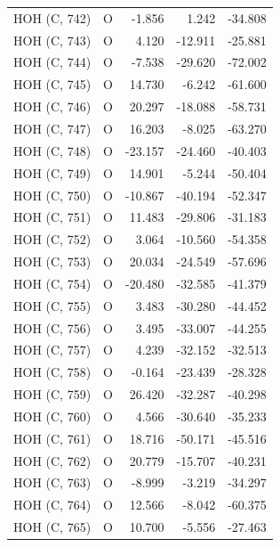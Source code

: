 \begin{longtable}{@{}lcrr@{}}
  \cmidrule(r){1-5}
  HOH (C, 742) & O & -1.856 & 1.242 & -34.808 \\
  \cmidrule(r){1-5}
  HOH (C, 743) & O & 4.120 & -12.911 & -25.881 \\
  \cmidrule(r){1-5}
  HOH (C, 744) & O & -7.538 & -29.620 & -72.002 \\
  \cmidrule(r){1-5}
  HOH (C, 745) & O & 14.730 & -6.242 & -61.600 \\
  \cmidrule(r){1-5}
  HOH (C, 746) & O & 20.297 & -18.088 & -58.731 \\
  \cmidrule(r){1-5}
  HOH (C, 747) & O & 16.203 & -8.025 & -63.270 \\
  \cmidrule(r){1-5}
  HOH (C, 748) & O & -23.157 & -24.460 & -40.403 \\
  \cmidrule(r){1-5}
  HOH (C, 749) & O & 14.901 & -5.244 & -50.404 \\
  \cmidrule(r){1-5}
  HOH (C, 750) & O & -10.867 & -40.194 & -52.347 \\
  \cmidrule(r){1-5}
  HOH (C, 751) & O & 11.483 & -29.806 & -31.183 \\
  \cmidrule(r){1-5}
  HOH (C, 752) & O & 3.064 & -10.560 & -54.358 \\
  \cmidrule(r){1-5}
  HOH (C, 753) & O & 20.034 & -24.549 & -57.696 \\
  \cmidrule(r){1-5}
  HOH (C, 754) & O & -20.480 & -32.585 & -41.379 \\
  \cmidrule(r){1-5}
  HOH (C, 755) & O & 3.483 & -30.280 & -44.452 \\
  \cmidrule(r){1-5}
  HOH (C, 756) & O & 3.495 & -33.007 & -44.255 \\
  \cmidrule(r){1-5}
  HOH (C, 757) & O & 4.239 & -32.152 & -32.513 \\
  \cmidrule(r){1-5}
  HOH (C, 758) & O & -0.164 & -23.439 & -28.328 \\
  \cmidrule(r){1-5}
  HOH (C, 759) & O & 26.420 & -32.287 & -40.298 \\
  \cmidrule(r){1-5}
  HOH (C, 760) & O & 4.566 & -30.640 & -35.233 \\
  \cmidrule(r){1-5}
  HOH (C, 761) & O & 18.716 & -50.171 & -45.516 \\
  \cmidrule(r){1-5}
  HOH (C, 762) & O & 20.779 & -15.707 & -40.231 \\
  \cmidrule(r){1-5}
  HOH (C, 763) & O & -8.999 & -3.219 & -34.297 \\
  \cmidrule(r){1-5}
  HOH (C, 764) & O & 12.566 & -8.042 & -60.375 \\
  \cmidrule(r){1-5}
  HOH (C, 765) & O & 10.700 & -5.556 & -27.463 \\

\end{longtable}
